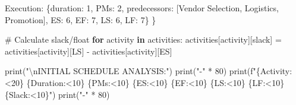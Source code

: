\documentclass[
  letterpaper,
  DIV=11,
  numbers=noendperiod]{scrreprt}
\newenvironment{Shaded}{\begin{snugshade}}{\end{snugshade}}
\newcommand{\BuiltInTok}[1]{\textcolor[rgb]{0.00,0.23,0.31}{#1}}
\newcommand{\CharTok}[1]{\textcolor[rgb]{0.13,0.47,0.30}{#1}}
\newcommand{\CommentTok}[1]{\textcolor[rgb]{0.37,0.37,0.37}{#1}}
\newcommand{\ControlFlowTok}[1]{\textcolor[rgb]{0.00,0.23,0.31}{\textbf{#1}}}
\newcommand{\DecValTok}[1]{\textcolor[rgb]{0.68,0.00,0.00}{#1}}
\newcommand{\KeywordTok}[1]{\textcolor[rgb]{0.00,0.23,0.31}{\textbf{#1}}}
\newcommand{\NormalTok}[1]{\textcolor[rgb]{0.00,0.23,0.31}{#1}}
\newcommand{\OperatorTok}[1]{\textcolor[rgb]{0.37,0.37,0.37}{#1}}
\newcommand{\SpecialCharTok}[1]{\textcolor[rgb]{0.37,0.37,0.37}{#1}}
\newcommand{\SpecialStringTok}[1]{\textcolor[rgb]{0.13,0.47,0.30}{#1}}
\newcommand{\StringTok}[1]{\textcolor[rgb]{0.13,0.47,0.30}{#1}}
\begin{document}
\begin{Shaded}
\begin{Highlighting}[]
        \StringTok{\textquotesingle{}Execution\textquotesingle{}}\NormalTok{: \{}\StringTok{\textquotesingle{}duration\textquotesingle{}}\NormalTok{: }\DecValTok{1}\NormalTok{, }\StringTok{\textquotesingle{}PMs\textquotesingle{}}\NormalTok{: }\DecValTok{2}\NormalTok{, }\StringTok{\textquotesingle{}predecessors\textquotesingle{}}\NormalTok{: [}\StringTok{\textquotesingle{}Vendor Selection\textquotesingle{}}\NormalTok{, }\StringTok{\textquotesingle{}Logistics\textquotesingle{}}\NormalTok{, }\StringTok{\textquotesingle{}Promotion\textquotesingle{}}\NormalTok{], }
                      \StringTok{\textquotesingle{}ES\textquotesingle{}}\NormalTok{: }\DecValTok{6}\NormalTok{, }\StringTok{\textquotesingle{}EF\textquotesingle{}}\NormalTok{: }\DecValTok{7}\NormalTok{, }\StringTok{\textquotesingle{}LS\textquotesingle{}}\NormalTok{: }\DecValTok{6}\NormalTok{, }\StringTok{\textquotesingle{}LF\textquotesingle{}}\NormalTok{: }\DecValTok{7}\NormalTok{\}}
\NormalTok{    \}}
    
    \CommentTok{\# Calculate slack/float}
    \ControlFlowTok{for}\NormalTok{ activity }\KeywordTok{in}\NormalTok{ activities:}
\NormalTok{        activities[activity][}\StringTok{\textquotesingle{}slack\textquotesingle{}}\NormalTok{] }\OperatorTok{=}\NormalTok{ activities[activity][}\StringTok{\textquotesingle{}LS\textquotesingle{}}\NormalTok{] }\OperatorTok{{-}}\NormalTok{ activities[activity][}\StringTok{\textquotesingle{}ES\textquotesingle{}}\NormalTok{]}
    
    \BuiltInTok{print}\NormalTok{(}\StringTok{"}\CharTok{\textbackslash{}n}\StringTok{INITIAL SCHEDULE ANALYSIS:"}\NormalTok{)}
    \BuiltInTok{print}\NormalTok{(}\StringTok{"{-}"} \OperatorTok{*} \DecValTok{80}\NormalTok{)}
    \BuiltInTok{print}\NormalTok{(}\SpecialStringTok{f"}\SpecialCharTok{\{}\StringTok{\textquotesingle{}Activity\textquotesingle{}}\SpecialCharTok{:\textless{}20\}}\SpecialStringTok{ }\SpecialCharTok{\{}\StringTok{\textquotesingle{}Duration\textquotesingle{}}\SpecialCharTok{:\textless{}10\}}\SpecialStringTok{ }\SpecialCharTok{\{}\StringTok{\textquotesingle{}PMs\textquotesingle{}}\SpecialCharTok{:\textless{}10\}}\SpecialStringTok{ }\SpecialCharTok{\{}\StringTok{\textquotesingle{}ES\textquotesingle{}}\SpecialCharTok{:\textless{}10\}}\SpecialStringTok{ }\SpecialCharTok{\{}\StringTok{\textquotesingle{}EF\textquotesingle{}}\SpecialCharTok{:\textless{}10\}}\SpecialStringTok{ }\SpecialCharTok{\{}\StringTok{\textquotesingle{}LS\textquotesingle{}}\SpecialCharTok{:\textless{}10\}}\SpecialStringTok{ }\SpecialCharTok{\{}\StringTok{\textquotesingle{}LF\textquotesingle{}}\SpecialCharTok{:\textless{}10\}}\SpecialStringTok{ }\SpecialCharTok{\{}\StringTok{\textquotesingle{}Slack\textquotesingle{}}\SpecialCharTok{:\textless{}10\}}\SpecialStringTok{"}\NormalTok{)}
    \BuiltInTok{print}\NormalTok{(}\StringTok{"{-}"} \OperatorTok{*} \DecValTok{80}\NormalTok{)}
    

\end{Highlighting}
\end{Shaded}
\end{document}
